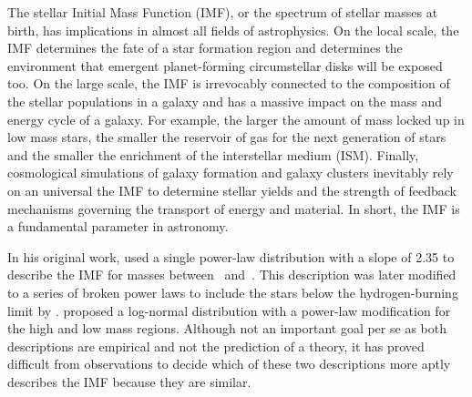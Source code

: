 The stellar Initial Mass Function (IMF), or the spectrum of stellar masses at birth,  has implications in almost all fields of astrophysics.  On the local scale, the IMF determines the fate of a star formation region and determines the environment that emergent planet-forming circumstellar disks will be exposed too. On the large scale, the IMF is irrevocably connected to the composition of the stellar populations in a galaxy and has a massive impact on the mass and energy cycle of a galaxy. For example, the larger the amount of mass locked up in low mass stars, the smaller the reservoir of gas for the next generation of stars and the smaller the enrichment of the interstellar medium (ISM). Finally, cosmological simulations of galaxy formation and galaxy clusters inevitably rely on an universal the IMF to determine stellar yields and the strength of feedback mechanisms governing the transport of energy and material. In short, the IMF is a fundamental parameter in astronomy. 


In his original work, \citet{salpeter1955} used a single power-law distribution with a slope of 2.35 to describe the IMF for masses between \ and \,\msun . This description was later modified to a series of broken power laws to include the stars below the hydrogen-burning limit by \citet{kroupa2001}. \citet{chabrier2005} proposed a log-normal distribution with a power-law modification for the high and low mass regions. Although not an important goal per se as both descriptions are empirical and not the prediction of a theory, it has proved difficult from observations to decide which of these two descriptions more aptly describes the IMF because they are similar.

